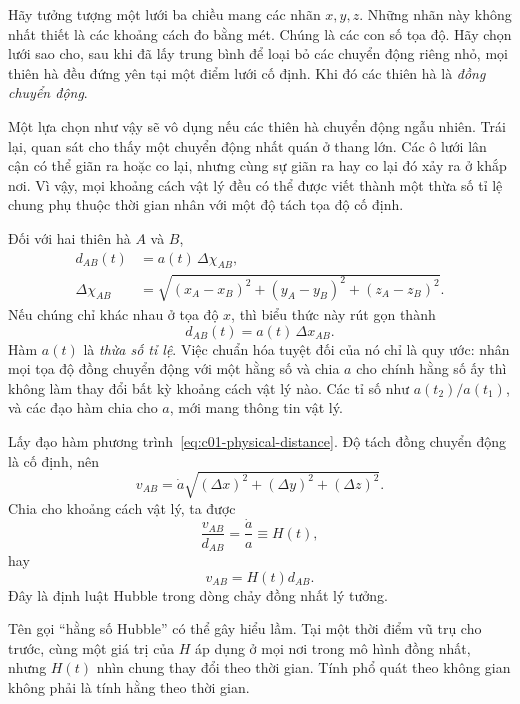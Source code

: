 Hãy tưởng tượng một lưới ba chiều mang các nhãn \(x,y,z\). Những nhãn này không nhất thiết là các khoảng cách đo bằng mét. Chúng là các con số tọa độ. Hãy chọn lưới sao cho, sau khi đã lấy trung bình để loại bỏ các chuyển động riêng nhỏ, mọi thiên hà đều đứng yên tại một điểm lưới cố định. Khi đó các thiên hà là \emph{đồng chuyển động}.

Một lựa chọn như vậy sẽ vô dụng nếu các thiên hà chuyển động ngẫu nhiên. Trái lại, quan sát cho thấy một chuyển động nhất quán ở thang lớn. Các ô lưới lân cận có thể giãn ra hoặc co lại, nhưng cùng sự giãn ra hay co lại đó xảy ra ở khắp nơi. Vì vậy, mọi khoảng cách vật lý đều có thể được viết thành một thừa số tỉ lệ chung phụ thuộc thời gian nhân với một độ tách tọa độ cố định.

Đối với hai thiên hà \(A\) và \(B\),
\begin{equation}
\begin{aligned}
d_{AB}(t)&=a(t)\,\Delta\chi_{AB},\\
\Delta\chi_{AB}
&=\sqrt{(x_A-x_B)^2+(y_A-y_B)^2+(z_A-z_B)^2}.
\end{aligned}
\label{eq:c01-physical-distance}
\end{equation}
Nếu chúng chỉ khác nhau ở tọa độ \(x\), thì biểu thức này rút gọn thành
\begin{equation}
d_{AB}(t)=a(t)\,\Delta x_{AB}.
\end{equation}
Hàm \(a(t)\) là \emph{thừa số tỉ lệ}. Việc chuẩn hóa tuyệt đối của nó chỉ là quy ước: nhân mọi tọa độ đồng chuyển động với một hằng số và chia \(a\) cho chính hằng số ấy thì không làm thay đổi bất kỳ khoảng cách vật lý nào. Các tỉ số như \(a(t_2)/a(t_1)\), và các đạo hàm chia cho \(a\), mới mang thông tin vật lý.

Lấy đạo hàm phương trình~\eqref{eq:c01-physical-distance}. Độ tách đồng chuyển động là cố định, nên
\begin{equation}
v_{AB}=\dot a\sqrt{(\Delta x)^2+(\Delta y)^2+(\Delta z)^2}.
\end{equation}
Chia cho khoảng cách vật lý, ta được
\begin{equation}
\frac{v_{AB}}{d_{AB}}=\frac{\dot a}{a}\equiv H(t),
\label{eq:c01-hubble-parameter}
\end{equation}
hay
\begin{equation}
\boxed{v_{AB}=H(t)d_{AB}.}
\label{eq:c01-hubble-law}
\end{equation}
Đây là định luật Hubble trong dòng chảy đồng nhất lý tưởng.

Tên gọi “hằng số Hubble” có thể gây hiểu lầm. Tại một thời điểm vũ trụ cho trước, cùng một giá trị của \(H\) áp dụng ở mọi nơi trong mô hình đồng nhất, nhưng \(H(t)\) nhìn chung thay đổi theo thời gian. Tính phổ quát theo không gian không phải là tính hằng theo thời gian.


